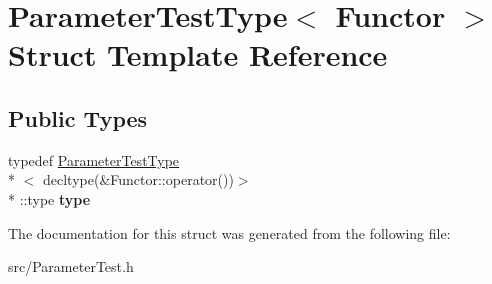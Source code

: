 \hypertarget{struct_parameter_test_type}{\section{Parameter\-Test\-Type$<$ Functor $>$ Struct Template Reference}
\label{struct_parameter_test_type}
}
\subsection*{Public Types}
\begin{DoxyCompactItemize}
\item 
\hypertarget{struct_parameter_test_type_a8455a1139325edc1fd259955ef611675}{typedef \hyperlink{struct_parameter_test_type}{Parameter\-Test\-Type}\\*
$<$ decltype(\&Functor\-::operator())$>$\\*
\-::type {\bfseries type}}\label{struct_parameter_test_type_a8455a1139325edc1fd259955ef611675}

\end{DoxyCompactItemize}


The documentation for this struct was generated from the following file\-:\begin{DoxyCompactItemize}
\item 
src/Parameter\-Test.\-h\end{DoxyCompactItemize}
